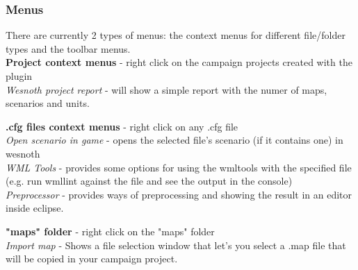 \documentclass[10pt]{article}
\begin{document}
\subsubsection{Menus}
There are currently 2 types of menus: the context menus for different file/folder types and the toolbar menus. \\

{\bf Project context menus} - right click on the campaign projects created with the plugin\\
   {\it Wesnoth project report} - will show a simple report with the numer of maps, scenarios and units.

{\bf .cfg files context menus} - right click on any .cfg file\\
   {\it Open scenario in game} - opens the selected file's scenario (if it contains one) in wesnoth \\
   {\it WML Tools} - provides some options for using the wmltools with the specified file 
   (e.g. run wmllint against the file and see the output in the console) \\
   {\it Preprocessor} - provides ways of preprocessing and showing the result in an editor inside eclipse.

{\bf "maps" folder} - right click on the "maps" folder\\
   {\it Import map} - Shows a file selection window that let's you select a .map file that will be copied in your campaign project.
\end{document}
